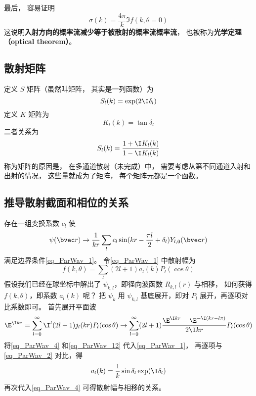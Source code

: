 最后， 容易证明
\begin{equation}
\sigma(k) = \frac{4\pi}{k} \Im f(k,\theta=0)
\end{equation}
这说明\textbf{入射方向的概率流减少等于被散射的概率流概率流}， 也被称为\textbf{光学定理（optical theorem）}。

\subsection{散射矩阵}
定义 $S$ 矩阵（虽然叫矩阵， 其实是一列函数）为
\begin{equation}
S_l(k) = \exp(2\I\delta_l)
\end{equation}
定义 $K$ 矩阵为
\begin{equation}
K_l(k) = \tan \delta_l
\end{equation}
二者关系为
\begin{equation}
S_l(k) = \frac{1 + \I K_l(k)}{1 - \I K_l(k)}
\end{equation}
称为矩阵的原因是， 在多通道散射（未完成）中， 需要考虑从第不同通道入射和出射的情况， 这些量就成为了矩阵， 每个矩阵元都是一个函数。

\subsection{推导散射截面和相位的关系}
存在一组变换系数 $c_l$ 使
\begin{equation}\label{eq_ParWav_2}
\psi(\bvec r) \rightarrow \frac{1}{kr} \sum_l c_l \sin(kr - \frac{\pi l}{2} + \delta_l) Y_{l,0}(\bvec r)
\end{equation}
满足边界条件\autoref{eq_ParWav_1}。 令\autoref{eq_ParWav_1} 中散射幅为
\begin{equation}\label{eq_ParWav_4}
f(k,\theta) = \sum_l (2l + 1) a_l(k) P_l(\cos \theta)
\end{equation}
假设我们已经在球坐标中解出了 $\psi_{k,l}$，即径向波函数 $R_{k,l}(r)$ 与相移， 如何获得 $f(k,\theta )$，即系数 $a_l(k)$ 呢？ 把 $\psi_k$ 用 $\psi_{k,l}$ 基底展开，即对 $P_l$ 展开，再逐项对比系数即可。 首先展开平面波
\begin{equation}\label{eq_ParWav_12}
\E^{\I kz} = \sum_{l = 0}^\infty  \I^l (2l + 1) j_l(kr) P_l(\cos \theta) \rightarrow \sum_{l=0}^\infty  (2l + 1)\frac{\E^{\I kr} - \E^{-\I(kr - l\pi)}}{2\I kr} P_l(\cos \theta)
\end{equation}
将\autoref{eq_ParWav_4} 和\autoref{eq_ParWav_12} 代入\autoref{eq_ParWav_1}， 再逐项与\autoref{eq_ParWav_2} 对比，得
\begin{equation}
a_l(k) = \frac{1}{k} \sin\delta_l \exp(\I \delta_l)
\end{equation}
再次代入\autoref{eq_ParWav_4} 可得散射幅与相移的关系。

